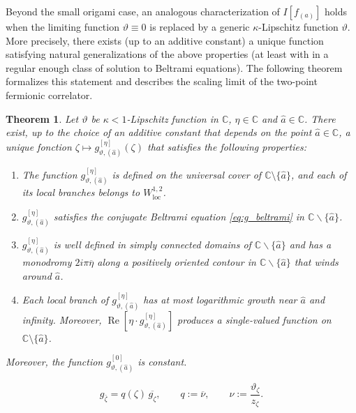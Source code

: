 \documentclass[10pt,a4paper]{amsart}
\newtheorem{theo}{Theorem}
\renewcommand\Re{\operatorname{Re}}
\begin{document}
Beyond the small origami case, an analogous characterization of $I[f_{(a)}]$ holds when the limiting function $\vartheta \equiv 0$ is replaced by a generic $\kappa$-Lipschitz function $\vartheta$. More precisely, there exists (up to an additive constant) a unique function satisfying natural generalizations of the above properties (at least with in a regular enough class of solution to Beltrami equations). The following theorem formalizes this statement and describes the scaling limit of the two-point fermionic correlator.
\begin{theo}\label{thm:existence-generalised-log}
	Let $\vartheta$ be $\kappa<1$-Lipschitz function in $\mathbb{C}$, $\eta \in \mathbb{C}$ and $\hat{a}\in \mathbb{C}$. There exist, up to the choice of an additive constant that depends on the point $\hat{a}\in \mathbb{C}$, a unique fonction  $\zeta \mapsto g^{[\eta]}_{\vartheta,(\hat{a})}(\zeta) $ that satisfies the following properties:
	\begin{enumerate}
	\item The function \(g^{[\eta]}_{\vartheta,(\hat{a})}\) is defined on the universal cover of $\mathbb C\setminus\{\hat{a}\}$, and each of its local branches belongs to $W^{1,2}_{\mathrm{loc}}$.
		\item $g^{[\eta]}_{\vartheta,(\hat{a})}$ satisfies the conjugate Beltrami equation \eqref{eq:g_beltrami} in $\mathbb{C} \backslash \{ \hat{a} \} $.
		\item $g^{[\eta]}_{\vartheta,(\hat{a})}$ is well defined in simply connected domains of $ \mathbb{C}\backslash \{\hat{a}\}$ and has a monodromy $2i\pi \overline{\eta}$ along a positively oriented contour in $ \mathbb{C}\backslash \{\hat{a}\}$ that winds around $\hat{a}$.
		\item Each local branch of $g^{[\eta]}_{\vartheta,(\hat{a})}$ has at most logarithmic growth near $\hat{a}$ and  infinity. Moreover, $\Re[\eta \cdot g^{[\eta]}_{\vartheta,(\hat{a})}]$ produces a single-valued function on $\mathbb C\setminus\{\hat{a}\}$.	\end{enumerate}
Moreover, the function $g^{[0]}_{\vartheta,(\hat{a})}$ is constant.
	\end{theo}	

\begin{equation}\label{eq:conjugate-beltrami-local}
        g_{\bar\zeta}=q(\zeta)\,\overline{g_\zeta},
        \qquad
        q:=\overline\nu,
        \qquad
        \nu:=\frac{\vartheta_\zeta}{z_\zeta}.
\end{equation}
\end{document}
